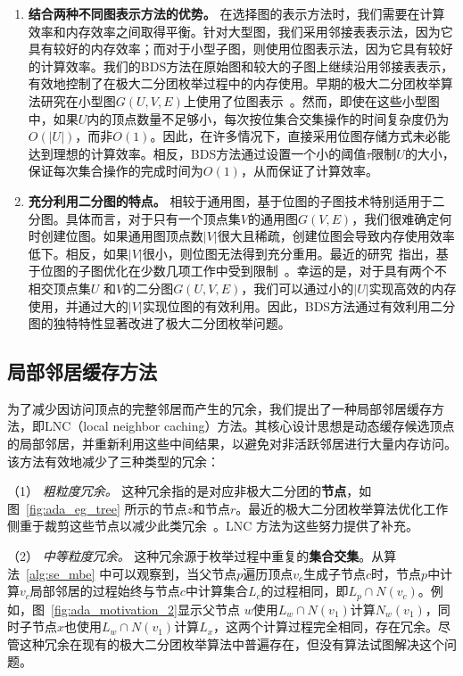   \begin{enumerate}
    \item \textbf{结合两种不同图表示方法的优势。} 在选择图的表示方法时，我们需要在计算效率和内存效率之间取得平衡。针对大型图，我们采用邻接表表示法，因为它具有较好的内存效率；而对于小型子图，则使用位图表示法，因为它具有较好的计算效率。我们的BDS方法在原始图和较大的子图上继续沿用邻接表表示，有效地控制了在极大二分团枚举过程中的内存使用。早期的极大二分团枚举算法研究在小型图$G(U, V, E)$上使用了位图表示~\cite{lcmmbc07,iMBEA14}。然而，即使在这些小型图中，如果$U$内的顶点数量不足够小，每次按位集合交集操作的时间复杂度仍为$O(|U|)$，而非$O(1)$。因此，在许多情况下，直接采用位图存储方式未必能达到理想的计算效率。相反，BDS方法通过设置一个小的阈值$\tau$限制$U$的大小，保证每次集合操作的完成时间为$O(1)$，从而保证了计算效率。
    
    \item \textbf{充分利用二分图的特点。} 相较于通用图，基于位图的子图技术特别适用于二分图。具体而言，对于只有一个顶点集$V$的通用图$G(V,E)$，我们很难确定何时创建位图。如果通用图顶点数$|V|$很大且稀疏，创建位图会导致内存使用效率低下。相反，如果$|V|$很小，则位图无法得到充分重用。最近的研究~\cite{Graphset23}指出，基于位图的子图优化在少数几项工作中受到限制~\cite{Sandslash21,Kclique22,g2miner22}。幸运的是，对于具有两个不相交顶点集$U$ 和$V$的二分图$G(U,V,E)$，我们可以通过小的$|U|$实现高效的内存使用，并通过大的$|V|$实现位图的有效利用。因此，BDS方法通过有效利用二分图的独特特性显著改进了极大二分团枚举问题。
  
  \end{enumerate}



\subsection{局部邻居缓存方法}
\label{subsec:ada_design_2}


为了减少因访问顶点的完整邻居而产生的冗余，我们提出了一种局部邻居缓存方法，即LNC（local neighbor caching）方法。其核心设计思想是动态缓存候选顶点的局部邻居，并重新利用这些中间结果，以避免对非活跃邻居进行大量内存访问。该方法有效地减少了三种类型的冗余：

（1） \emph{\textit{粗粒度冗余。}}
这种冗余指的是对应非极大二分团的\textbf{节点}，如图~\ref{fig:ada_eg_tree} 所示的节点$z$和节点$r$。最近的极大二分团枚举算法优化工作侧重于裁剪这些节点以减少此类冗余~\cite{iMBEA14,PMBE20,ooMBE22}。LNC 方法为这些努力提供了补充。

（2） \emph{\textit{中等粒度冗余。}}
这种冗余源于枚举过程中重复的\textbf{集合交集}。从算法~\ref{alg:se_mbe} 中可以观察到，当父节点$p$遍历顶点$v_c$生成子节点$c$时，节点$p$中计算$v_c$局部邻居的过程始终与节点$c$中计算集合$L_c$的过程相同，即$L_p\cap N(v_c)$。例如，图~\ref{fig:ada_motivation_2}显示父节点 $w$使用$L_w\cap N(v_1)$计算$N_w(v_1)$，同时子节点$x$也使用$L_w\cap N(v_1)$计算$L_x$，这两个计算过程完全相同，存在冗余。尽管这种冗余在现有的极大二分团枚举算法中普遍存在，但没有算法试图解决这个问题。

